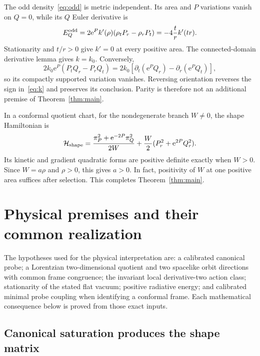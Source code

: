 \documentclass[11pt]{article}
\newcommand{\e}{\mathrm e}
\begin{document}
The odd density~\eqref{eq:odd} is metric independent. Its area and $P$ variations vanish on $Q=0$, while its $Q$ Euler derivative is
\begin{equation}\label{eq:k}
 E_Q^{\rm odd}=2\e^Pk'(\rho)(\rho_tP_r-\rho_rP_t)
 =-4\frac tr k'(tr).
\end{equation}
Stationarity and $t/r>0$ give $k'=0$ at every positive area. The connected-domain derivative lemma gives $k=k_0$. Conversely,
\begin{equation}
 2k_0\e^P(P_tQ_r-P_rQ_t)
 =2k_0\left[\partial_t(\e^PQ_r)-\partial_r(\e^PQ_t)\right],
\end{equation}
so its compactly supported variation vanishes. Reversing orientation reverses the sign in~\eqref{eq:k} and preserves its conclusion. Parity is therefore not an additional premise of Theorem~\ref{thm:main}.

In a conformal quotient chart, for the nondegenerate branch $W\ne0$, the shape Hamiltonian is
\begin{equation}\label{eq:H}
 \mathcal H_{\rm shape}=
 \frac{\pi_P^2+\e^{-2P}\pi_Q^2}{2W}
 +\frac W2(P_r^2+\e^{2P}Q_r^2).
\end{equation}
Its kinetic and gradient quadratic forms are positive definite exactly when $W>0$. Since $W=a\rho$ and $\rho>0$, this gives $a>0$. In fact, positivity of $W$ at one positive area suffices after selection. This completes Theorem~\ref{thm:main}.

\section{Physical premises and their common realization}\label{sec:physical}

The hypotheses used for the physical interpretation are: a calibrated canonical probe; a Lorentzian two-dimensional quotient and two spacelike orbit directions with common frame congruence; the invariant local derivative-two action class; stationarity of the stated flat vacuum; positive radiative energy; and calibrated minimal probe coupling when identifying a conformal frame. Each mathematical consequence below is proved from those exact inputs.

\subsection{Canonical saturation produces the shape matrix}
\end{document}
